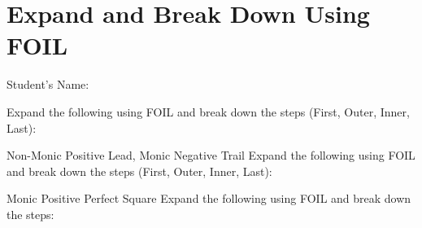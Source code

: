 \documentclass[12pt, a4paper, addpoints]{exam}
\newcommand{\monicleadnonmonictrail}{%
    \pgfmathtruncatemacro{\a}{random(2,5)} %
    \pgfmathtruncatemacro{\b}{random(1,5)} %
    \pgfmathtruncatemacro{\c}{random(1,5)} %
    \edef\result{(x + \b)(\a x + \c)}%
    \result
}
\newcommand{\nonmonicleadmonictrail}{%
    \pgfmathtruncatemacro{\a}{random(2,5)} %
    \pgfmathtruncatemacro{\b}{random(1,5)} %
    \pgfmathtruncatemacro{\c}{random(1,5)} %
    \edef\result{(\a x + \b)(x - \c)}%
    \result
}
\newcommand{\monicpositiveleadtrail}{%
    \pgfmathtruncatemacro{\b}{random(1,5)} %
    \edef\result{(x + \b)(x + \b)}%
    \result
}
\begin{document}
\section*{Expand and Break Down Using FOIL}
\quad Student's Name: \underline{\hspace{5cm}}

\begin{questions}
\LARGE

\question
Expand the following using FOIL and break down the steps (First, Outer, Inner, Last):
\setlength{\columnsep}{20pt}
\begin{multicols}{2}
\begin{parts}
    \part \( \monicleadnonmonictrail \)
    \ps
\end{parts}
\end{multicols}

\question Non-Monic Positive Lead, Monic Negative Trail
Expand the following using FOIL and break down the steps (First, Outer, Inner, Last):
\setlength{\columnsep}{20pt}
\begin{multicols}{2}
\begin{parts}
    \part \( \nonmonicleadmonictrail \)
    \ps
\end{parts}
\end{multicols}

\question Monic Positive Perfect Square
Expand the following using FOIL and break down the steps:
\setlength{\columnsep}{20pt}
\begin{multicols}{2}
\begin{parts}
    \part \( \monicpositiveleadtrail \)
    \ps
\end{parts}
\end{multicols}


\end{questions}
\end{document}
